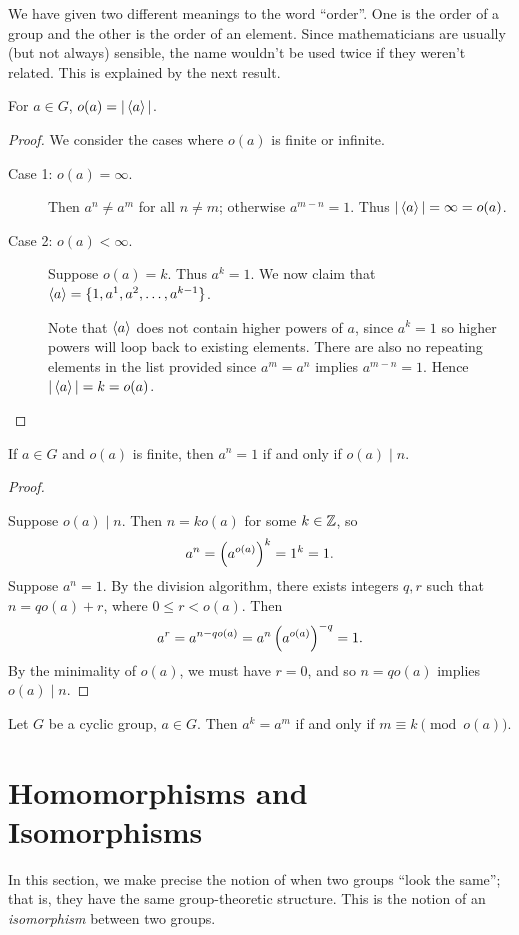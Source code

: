 We have given two different meanings to the word ``order''. One is the order of a group and the other is the order of an element. Since mathematicians are usually (but not always) sensible, the name wouldn't be used twice if they weren't related. This is explained by the next result.

\begin{lemma}
For $a\in G$, $o(a)=|\left\langle a\right\rangle|$.
\end{lemma}

\begin{proof}
We consider the cases where $o(a)$ is finite or infinite.
\begin{description}
\item[Case 1: $o(a)=\infty$.] Then $a^n\neq a^m$ for all $n\neq m$; otherwise $a^{m-n}=1$. Thus $|\left\langle a\right\rangle|=\infty=o(a)$.

\item[Case 2: $o(a)<\infty$.] Suppose $o(a)=k$. Thus $a^k=1$. We now claim that $\left\langle a\right\rangle=\{1,a^1,a^2,\dots,a^{k-1}\}$. 

Note that $\left\langle a\right\rangle$ does not contain higher powers of $a$, since $a^k=1$ so higher powers will loop back to existing elements. There are also no repeating elements in the list provided since $a^m=a^n$ implies $a^{m-n}=1$. Hence $|\left\langle a\right\rangle|=k=o(a)$.
\end{description}
\end{proof}

\begin{lemma}
If $a\in G$ and $o(a)$ is finite, then $a^n=1$ if and only if $o(a)\mid n$.
\end{lemma}

\begin{proof} \

\fbox{$\impliedby$} Suppose $o(a)\mid n$. Then $n=ko(a)$ for some $k\in\mathbb Z$, so
\[a^n=\left(a^{o(a)}\right)^k=1^k=1.\]
\fbox{$\implies$} Suppose $a^n=1$. By the division algorithm, there exists integers $q,r$ such that $n=qo(a)+r$, where $0\le r<o(a)$. Then
\[a^r=a^{n-qo(a)}=a^n\left(a^{o(a)}\right)^{-q}=1.\]
By the minimality of $o(a)$, we must have $r=0$, and so $n=qo(a)$ implies $o(a)\mid n$.
\end{proof}

\begin{corollary}
Let $G$ be a cyclic group, $a\in G$. Then $a^k=a^m$ if and only if $m\equiv k\pmod{o(a)}$.
\end{corollary}
\pagebreak

\section{Homomorphisms and Isomorphisms}
In this section, we make precise the notion of when two groups ``look the same''; that is, they have the same group-theoretic structure. This is the notion of an \emph{isomorphism} between two groups.

